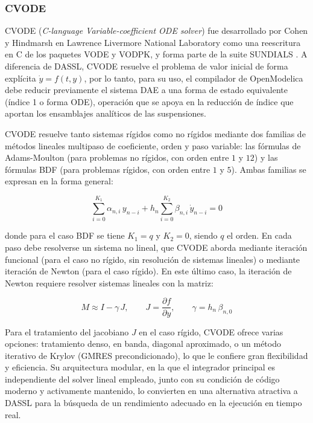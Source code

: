 \subsubsection*{CVODE}

CVODE (\textit{C-language Variable-coefficient ODE solver}) fue desarrollado por Cohen y Hindmarsh en Lawrence Livermore National Laboratory como una reescritura en C de los paquetes VODE y VODPK, y forma parte de la suite SUNDIALS \cite{cohen1995}. A diferencia de DASSL, CVODE resuelve el problema de valor inicial de forma explícita $\dot{y} = f(t, y)$, por lo tanto, para su uso, el compilador de OpenModelica debe reducir previamente el sistema DAE a una forma de estado equivalente (índice 1 o forma ODE), operación que se apoya en la reducción de índice que aportan los ensamblajes analíticos de las suspensiones.

CVODE resuelve tanto sistemas rígidos como no rígidos mediante dos familias de métodos lineales multipaso de coeficiente, orden y paso variable: las fórmulas de Adams-Moulton (para problemas no rígidos, con orden entre $1$ y $12$) y las fórmulas BDF (para problemas rígidos, con orden entre $1$ y $5$). Ambas familias se expresan en la forma general:

\begin{equation}
	\sum_{i=0}^{K_1} \alpha_{n,i}\, y_{n-i} + h_n \sum_{i=0}^{K_2} \beta_{n,i}\, \dot{y}_{n-i} = 0
\end{equation}

donde para el caso BDF se tiene $K_1 = q$ y $K_2 = 0$, siendo $q$ el orden. En cada paso debe resolverse un sistema no lineal, que CVODE aborda mediante iteración funcional (para el caso no rígido, sin resolución de sistemas lineales) o mediante iteración de Newton (para el caso rígido). En este último caso, la iteración de Newton requiere resolver sistemas lineales con la matriz:

\begin{equation}
	M \approx I - \gamma\, J, \qquad J = \frac{\partial f}{\partial y}, \qquad \gamma = h_n\, \beta_{n,0}
\end{equation}

Para el tratamiento del jacobiano $J$ en el caso rígido, CVODE ofrece varias opciones: tratamiento denso, en banda, diagonal aproximado, o un método iterativo de Krylov (GMRES precondicionado), lo que le confiere gran flexibilidad y eficiencia. Su arquitectura modular, en la que el integrador principal es independiente del solver lineal empleado, junto con su condición de código moderno y activamente mantenido, lo convierten en una alternativa atractiva a DASSL para la búsqueda de un rendimiento adecuado en la ejecución en tiempo real.\\


